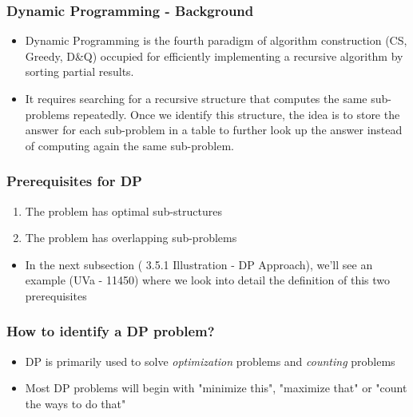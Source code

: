 \documentclass{beamer}
\begin{document}
\begin{frame}[fragile]
\frametitle{Dynamic Programming - Background}

\begin{itemize}
    \item Dynamic Programming is the fourth paradigm of algorithm construction (CS, Greedy, D\&Q) occupied for efficiently implementing a recursive algorithm by sorting partial results. 
    
    \pause
    \item It requires searching for a recursive structure that computes the same sub-problems repeatedly. Once we identify this structure, the idea is to store the answer for each sub-problem in a table to further look up the answer instead of computing again the same sub-problem.
\end{itemize}

\end{frame}

\begin{frame}[fragile]
\frametitle{Prerequisites for DP}

\begin{enumerate}
    \item The problem has optimal sub-structures
	\item The problem has overlapping sub-problems
\end{enumerate}

\vspace{1cm}

\begin{itemize}
    \item In the next subsection (\color{blue} 3.5.1 Illustration - DP Approach\color{black}), we'll see an example (UVa - 11450) where we look into detail the definition of this two prerequisites
\end{itemize}

\end{frame}

\begin{frame}[fragile]
\frametitle{How to identify a DP problem?}

\begin{itemize}
    \item DP is primarily used to solve \textit{optimization} problems and \textit{counting} problems
    \item Most DP problems will begin with "minimize this", "maximize that" or "count the ways to do that"
\end{itemize}
\end{frame}
\end{document}

